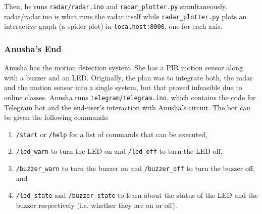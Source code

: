 \documentclass[12pt, a4paper]{article}
\theoremstyle{definition}
\theoremstyle{remark}
\begin{document}
Then, he runs \texttt{radar/radar.ino} and \texttt{radar\_plotter.py} simultaneously. \ttfamily radar/\allowbreak radar.ino \normalfont is what runs the radar itself while \texttt{radar\_plotter.py} plots an interactive graph (a spider plot) in \texttt{localhost:8000}, one for each axis.



\subsubsection*{Anusha's End}
Anusha has the motion detection system. She has a PIR motion sensor along with a buzzer and an LED. Originally, the plan was to integrate both, the radar and the motion sensor into a single system, but that proved infeasible due to online classes. Anusha runs \texttt{telegram/\allowbreak telegram.ino}, which contains the code for Telegram bot and the end-user's interaction with Anusha's circuit. The bot can be given the following commands:
\begin{enumerate}
    \item \texttt{/start} or \texttt{/help} for a list of commands that can be executed,
    \item \texttt{/led\_warn} to turn the LED on and \texttt{/led\_off} to turn the LED off,
    \item \texttt{/buzzer\_warn} to turn the buzzer on and \texttt{/buzzer\_off} to turn the buzzer off, and
    \item \texttt{/led\_state} and \texttt{/buzzer\_state} to learn about the status of the LED and the buzzer respectively (i.e. whether they are on or off).
\end{enumerate}
\end{document}
